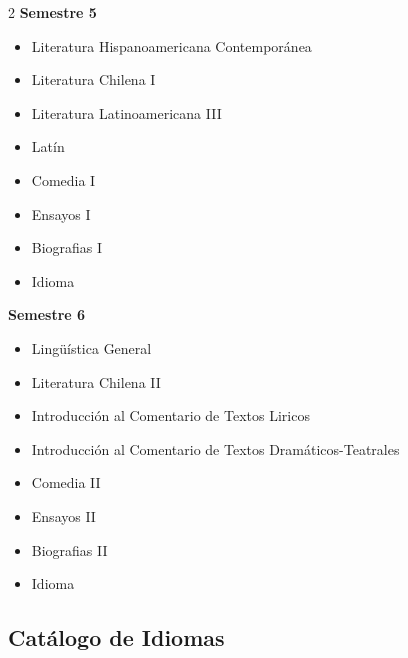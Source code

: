 \documentclass[12pt,a4paper]{article}
\begin{document}
\begin{multicols}{2}
		\textbf{Semestre 5}
		\begin{itemize}
			\item Literatura Hispanoamericana Contemporánea
			\item Literatura Chilena I
			\item Literatura Latinoamericana III
			\item Latín
			\item Comedia I
			\item Ensayos I
			\item Biografias I
			\item Idioma
		\end{itemize}
		
		\textbf{Semestre 6}
		\begin{itemize}
			\item Lingüística General
			\item Literatura Chilena II
			\item Introducción al Comentario de Textos Liricos
			\item Introducción al Comentario de Textos Dramáticos-Teatrales
			\item Comedia II
			\item Ensayos II
			\item Biografias II
			\item Idioma
		\end{itemize}
	\end{multicols}
	
	\newpage
	
	\subsection{Catálogo de Idiomas}
	
\end{document}
